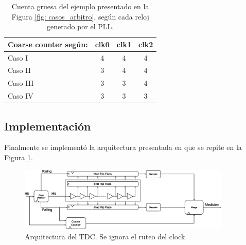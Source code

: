 \begin{table}[H]
     \centering
     \begin{tabular}{|l|c|c|c|}
     \hline
     Coarse counter según: & clk0 & clk1 & clk2 \\ \hline
     Caso I                & 4    & 4    & 4    \\ \hline
     Caso II               & 3    & 4    & 4    \\ \hline
     Caso III              & 3    & 3    & 4    \\ \hline
     Caso IV               & 3    & 3    & 3    \\ \hline
     \end{tabular}
     \caption{Cuenta gruesa del ejemplo presentado en la Figura \ref{fig: casos_arbitro}, según cada reloj generado por el PLL.}
     \label{tabla: arbitro}
\end{table}


\subsection{Implementación}
Finalmente se implementó la arquitectura presentada en \cite{machado_novel_2018} que se repite en la Figura \ref{fig: TDC}.
\begin{figure}[H]
     \centering
     \includegraphics[width=0.9\textwidth]{imagenes/arq_tdc.eps}
     \caption{Arquitectura del TDC. Se ignora el ruteo del clock.}
     \label{fig: TDC}
\end{figure}

